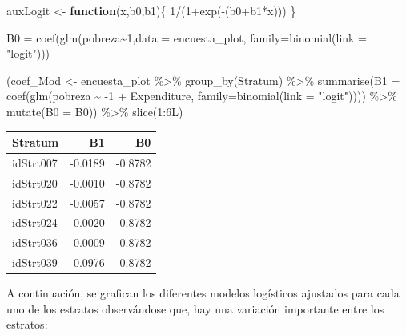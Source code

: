 \documentclass[
  12pt,
]{book}
\newenvironment{Shaded}{\begin{snugshade}}{\end{snugshade}}
\newcommand{\AttributeTok}[1]{\textcolor[rgb]{0.77,0.63,0.00}{#1}}
\newcommand{\ControlFlowTok}[1]{\textcolor[rgb]{0.13,0.29,0.53}{\textbf{#1}}}
\newcommand{\DecValTok}[1]{\textcolor[rgb]{0.00,0.00,0.81}{#1}}
\newcommand{\FunctionTok}[1]{\textcolor[rgb]{0.00,0.00,0.00}{#1}}
\newcommand{\NormalTok}[1]{#1}
\newcommand{\OtherTok}[1]{\textcolor[rgb]{0.56,0.35,0.01}{#1}}
\newcommand{\SpecialCharTok}[1]{\textcolor[rgb]{0.00,0.00,0.00}{#1}}
\newcommand{\StringTok}[1]{\textcolor[rgb]{0.31,0.60,0.02}{#1}}
\begin{document}
\begin{Shaded}
\begin{Highlighting}[]
\NormalTok{auxLogit }\OtherTok{\textless{}{-}} \ControlFlowTok{function}\NormalTok{(x,b0,b1)\{}
  \DecValTok{1}\SpecialCharTok{/}\NormalTok{(}\DecValTok{1}\SpecialCharTok{+}\FunctionTok{exp}\NormalTok{(}\SpecialCharTok{{-}}\NormalTok{(b0}\SpecialCharTok{+}\NormalTok{b1}\SpecialCharTok{*}\NormalTok{x)))}
\NormalTok{\}}

\NormalTok{B0 }\OtherTok{=} \FunctionTok{coef}\NormalTok{(}\FunctionTok{glm}\NormalTok{(pobreza}\SpecialCharTok{\textasciitilde{}}\DecValTok{1}\NormalTok{,}\AttributeTok{data =}\NormalTok{ encuesta\_plot,}
     \AttributeTok{family=}\FunctionTok{binomial}\NormalTok{(}\AttributeTok{link =} \StringTok{"logit"}\NormalTok{)))}

\NormalTok{(coef\_Mod }\OtherTok{\textless{}{-}}\NormalTok{ encuesta\_plot }\SpecialCharTok{\%\textgreater{}\%} \FunctionTok{group\_by}\NormalTok{(Stratum) }\SpecialCharTok{\%\textgreater{}\%} 
  \FunctionTok{summarise}\NormalTok{(}\AttributeTok{B1 =} \FunctionTok{coef}\NormalTok{(}\FunctionTok{glm}\NormalTok{(pobreza }\SpecialCharTok{\textasciitilde{}}  \SpecialCharTok{{-}}\DecValTok{1} \SpecialCharTok{+}\NormalTok{ Expenditure,}
              \AttributeTok{family=}\FunctionTok{binomial}\NormalTok{(}\AttributeTok{link =} \StringTok{"logit"}\NormalTok{)))) }\SpecialCharTok{\%\textgreater{}\%} 
\FunctionTok{mutate}\NormalTok{(}\AttributeTok{B0 =}\NormalTok{ B0)) }\SpecialCharTok{\%\textgreater{}\%} \FunctionTok{slice}\NormalTok{(}\DecValTok{1}\SpecialCharTok{:}\NormalTok{6L)}
\end{Highlighting}
\end{Shaded}

\begin{tabular}{l|r|r}
\hline
Stratum & B1 & B0\\
\hline
idStrt007 & -0.0189 & -0.8782\\
\hline
idStrt020 & -0.0010 & -0.8782\\
\hline
idStrt022 & -0.0057 & -0.8782\\
\hline
idStrt024 & -0.0020 & -0.8782\\
\hline
idStrt036 & -0.0009 & -0.8782\\
\hline
idStrt039 & -0.0976 & -0.8782\\
\hline
\end{tabular}

A continuación, se grafican los diferentes modelos logísticos ajustados para cada uno de los estratos observándose que, hay una variación importante entre los estratos:
\end{document}
